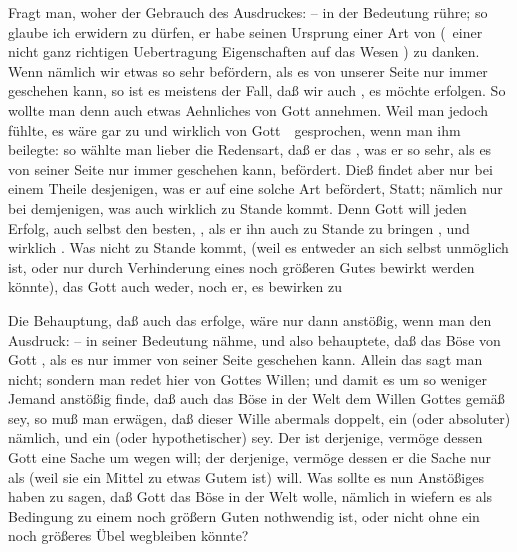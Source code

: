 \begin{aufza}
\begin{aufzb}
\begin{aufzc}
\begin{RWanm}
Fragt man, woher der Gebrauch des Ausdruckes:  -- in der  Bedeutung rühre; so glaube ich erwidern zu dürfen, er habe seinen Ursprung einer Art von  (\dh\ einer nicht ganz richtigen Uebertragung  Eigenschaften auf das Wesen ) zu danken. Wenn nämlich wir  etwas so sehr befördern, als es von unserer Seite nur immer geschehen kann, so ist es meistens der Fall, daß wir auch , es möchte erfolgen. So wollte man denn auch etwas Aehnliches von Gott annehmen. Weil man jedoch fühlte, es wäre gar zu  und wirklich  von Gott~\ gesprochen, wenn man ihm  beilegte: so wählte man lieber die Redensart, daß er das , was er so sehr, als es von seiner Seite nur immer geschehen kann, befördert. Dieß  findet aber nur bei einem Theile desjenigen, was er auf eine solche Art befördert, Statt; nämlich nur bei demjenigen, was auch wirklich zu Stande kommt. Denn Gott will jeden Erfolg, auch selbst den besten, , als er ihn auch zu Stande zu bringen , und wirklich . Was nicht zu Stande kommt, (weil es entweder an sich selbst unmöglich ist, oder nur durch Verhinderung eines noch größeren Gutes bewirkt werden könnte), das  Gott auch weder, noch  er, es bewirken zu 
\end{RWanm}
\item Die Behauptung, daß auch das  erfolge, wäre nur dann anstößig, wenn man den Ausdruck:  -- in seiner  Bedeutung nähme, und also behauptete, daß das Böse von Gott , als es nur immer von seiner Seite geschehen kann. Allein das sagt man nicht; sondern man redet hier von Gottes  Willen; und damit es um so weniger Jemand anstößig finde, daß auch das Böse in der Welt dem  Willen Gottes gemäß sey, so muß man erwägen, daß dieser Wille abermals doppelt, ein  (oder absoluter) nämlich, und ein  (oder hypothetischer) sey. Der  ist derjenige, vermöge dessen Gott eine Sache um  wegen will; der  derjenige, vermöge dessen er die Sache nur als  (weil sie ein Mittel zu etwas Gutem ist) will. Was sollte es nun Anstößiges haben zu sagen, daß Gott das Böse in der Welt  wolle, nämlich in wiefern es als Bedingung zu einem noch größern Guten nothwendig ist, oder nicht ohne ein noch größeres Übel wegbleiben könnte?

\end{aufzc}
\end{aufzb}
\end{aufza}
